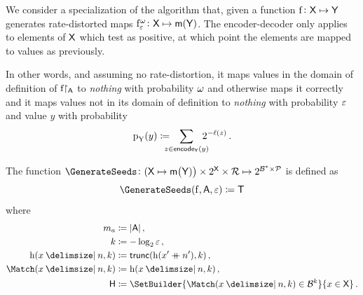 \documentclass[11pt,final,hidelinks]{article}
\providecommand{\Encode}{\mathsf{encode}}
\providecommand{\trunc}{\mathsf{trunc}}
\newcommand{\BL}{\ell}  %
\begin{document}
We consider a specialization of the algorithm that, given a function $\Fun{f} \colon \Set{X} \mapsto \Set{Y}$ generates rate-distorted maps $\APFun{f}[\fprate][\fnrate] \colon \Set{X} \mapsto \Maybe{\Set{Y}}$.
The encoder-decoder only applies to elements of $\Set{X}$ which test as positive, at which point the elements are mapped to values as previously.

In other words, and assuming no rate-distortion, it maps values in the domain of definition of $\Fun{f}\!\!\restriction_{\Set{A}}$ to \emph{nothing} with probability $\omega$ and otherwise maps it correctly and it maps values not in its domain of definition to \emph{nothing} with probability $\varepsilon$ and value $y$ with probability
\begin{equation}
	\Fun{p}_{\RV{Y}}(y) \coloneqq \!\!\!\!\! \sum_{z \in \Encode_{\Set{Y}}(y)} \!\!\!\!\! 2^{-\BL(z)}\,.
\end{equation}

The function $\GenerateSeeds \colon (\Set{X} \mapsto \Maybe{\Set{Y})} \times \PS{\Set{X}} \times \FancySet{R} \mapsto \PS{\BitSet^* \times \FancySet{P}}$ is defined as
\begin{equation}
	\GenerateSeeds(\Fun{f}, \Set{A}, \fprate) \coloneqq \PlainSet{T}
	\end{equation}
where
\begin{equation}
\begin{split}
	m_a						&\coloneqq \Card{\Set{A}}\,,\\
	k						&\coloneqq -\log_2 \fprate\,,\\
	\Fun{h}(x \Given n,k)	&\coloneqq \trunc(\hash(x' \cat n'),k)\,,\\	
	\Match(x \Given n,k)	&\coloneqq \Fun{h}(x \Given n,k)\,,\\
	\PlainSet{H} 			&\coloneqq \SetBuilder{\Match(x \Given n,k) \in \BitSet^{k}}{x \in \Set{X}}\,.
\end{split}
\end{equation}
\end{document}
